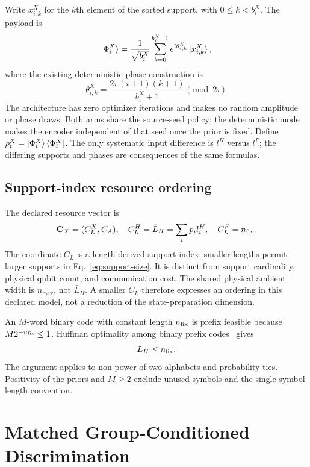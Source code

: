 \documentclass[reprint,amsmath,amssymb,aps,pra,floatfix]{revtex4-2}
\begin{document}
Write $x_{i,k}^X$ for the $k$th element of the sorted support, with $0\le k<b_i^X$. The payload is
\begin{equation}
 \ket{\Phi_i^X}=\frac{1}{\sqrt{b_i^X}}
 \sum_{k=0}^{b_i^X-1} e^{i\theta_{i,k}^X}\ket{x_{i,k}^X},
 \label{eq:payload}
\end{equation}
where the existing deterministic phase construction is
\begin{equation}
 \theta_{i,k}^X=\frac{2\pi(i+1)(k+1)}{b_i^X+1}\pmod{2\pi}.
 \label{eq:phase}
\end{equation}
The architecture has zero optimizer iterations and makes no random amplitude or phase draws. Both arms share the source-seed policy; the deterministic mode makes the encoder independent of that seed once the prior is fixed. Define $\rho_i^X=\ket{\Phi_i^X}\bra{\Phi_i^X}$. The only systematic input difference is $l^H$ versus $l^F$; the differing supports and phases are consequences of the same formulas.

\subsection{Support-index resource ordering}
The declared resource vector is
\begin{equation}
 \mathbf C_X=(C_L^X,C_A),\quad
 C_L^H=\bar L_H=\sum_i p_i l_i^H,\quad C_L^F=n_{\rm fix}.
 \label{eq:resource-vector}
\end{equation}
The coordinate $C_L$ is a length-derived support index: smaller lengths permit larger supports in Eq.~\eqref{eq:support-size}. It is distinct from support cardinality, physical qubit count, and communication cost. The shared physical ambient width is $n_{\max}$, not $\bar L_H$. A smaller $C_L$ therefore expresses an ordering in this declared model, not a reduction of the state-preparation dimension.

An $M$-word binary code with constant length $n_{\rm fix}$ is prefix feasible because $M2^{-n_{\rm fix}}\le1$. Huffman optimality among binary prefix codes~\cite{huffman1952method,cover2006elements} gives
\begin{equation}
 \bar L_H\le n_{\rm fix}.
 \label{eq:length-order}
\end{equation}
The argument applies to non-power-of-two alphabets and probability ties. Positivity of the priors and $M\ge2$ exclude unused symbols and the single-symbol length convention.

\section{Matched Group-Conditioned Discrimination}
\label{sec:group}
\end{document}
